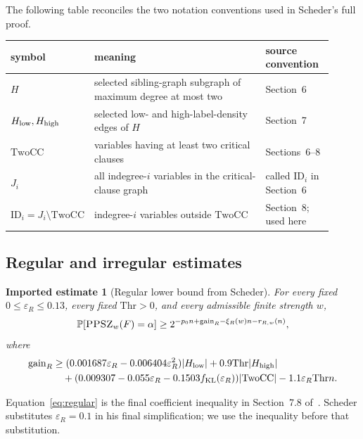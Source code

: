 \documentclass[11pt]{article}
\newtheorem{inputlemma}[theorem]{Imported estimate}
\newcommand{\PPSZ}{\textnormal{\textsc{PPSZ}}}
\newcommand{\TwoCC}{\mathrm{TwoCC}}
\newcommand{\ID}{\mathrm{ID}}
\newcommand{\eps}{\varepsilon}
\newcommand{\gain}{\mathrm{gain}}
\newcommand{\Thr}{\mathrm{Thr}}
\newcommand{\Prb}{\mathbb P}
\begin{document}
The following table reconciles the two notation conventions used in Scheder's full proof.
\begin{center}
\small
\renewcommand{\arraystretch}{1.12}
\begin{tabular}{@{}>{\raggedright\arraybackslash}p{0.16\linewidth}>{\raggedright\arraybackslash}p{0.54\linewidth}>{\raggedright\arraybackslash}p{0.21\linewidth}@{}}
\toprule
symbol & meaning & source convention\\
\midrule
$H$ & selected sibling-graph subgraph of maximum degree at most two & Section~6\\
$H_{\rm low},H_{\rm high}$ & selected low- and high-label-density edges of $H$ & Section~7\\
$\TwoCC$ & variables having at least two critical clauses & Sections~6--8\\
$J_i$ & all indegree-$i$ variables in the critical-clause graph & called $\ID_i$ in Section~6\\
$\ID_i=J_i\setminus\TwoCC$ & indegree-$i$ variables outside $\TwoCC$ & Section~8; used here\\
\bottomrule
\end{tabular}
\end{center}

\subsection{Regular and irregular estimates}

\begin{inputlemma}[Regular lower bound from Scheder]\label{lem:regular}
For every fixed $0\le\eps_R\le0.13$, every fixed $\Thr>0$, and every admissible finite strength $w$,
\[
 \Prb[\PPSZ_w(F)=\alpha]
 \ge
 2^{-p_0n+\gain_R-\xi_R(w)n-r_{R,w}(n)},
\]
where
\begin{align}
 \gain_R
 &\ge
 (0.001687\eps_R-0.006404\eps_R^2)|H_{\rm low}|
 +0.9\Thr|H_{\rm high}| \notag\\
 &\quad
 +(0.009307-0.055\eps_R-0.1503f_{\rm KL}(\eps_R))|\TwoCC|
 -1.1\eps_R\Thr n.
 \label{eq:regular}
\end{align}
\end{inputlemma}

Equation~\eqref{eq:regular} is the final coefficient inequality in Section~7.8 of~\cite{SchederFull}.  Scheder substitutes $\eps_R=0.1$ in his final simplification; we use the inequality before that substitution.
\end{document}
